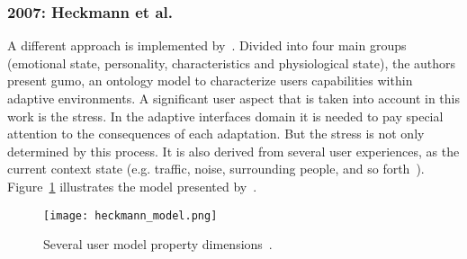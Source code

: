 
\subsubsection{2007: Heckmann et al.}
\label{sec:heckmann}

A different approach is implemented by~\citet{heckmann_gumogeneral_2005}.
Divided into four main groups (emotional state, personality, characteristics and
physiological state), the authors present \ac{gumo}, an ontology model to 
characterize users capabilities within adaptive environments. A significant 
user aspect that is taken into account in this work is the stress. In the 
adaptive interfaces domain it is needed to pay special attention to the 
consequences of each adaptation. But the stress is not only determined  by this 
process. It is also derived from several user experiences, as the current 
context state (e.g. traffic, noise, surrounding people, and so 
forth~\citep{babisch_noise_stress_2002}). Figure~\ref{fig:heckmann_model} illustrates
the model presented by~\citeauthor{heckmann_gumogeneral_2005}.


\begin{figure}
\centering
\texttt{[image: heckmann\_model.png]}
\caption{Several user model property
dimensions~\citep{heckmann_gumogeneral_2005}.}
\label{fig:heckmann_model}
\end{figure}

